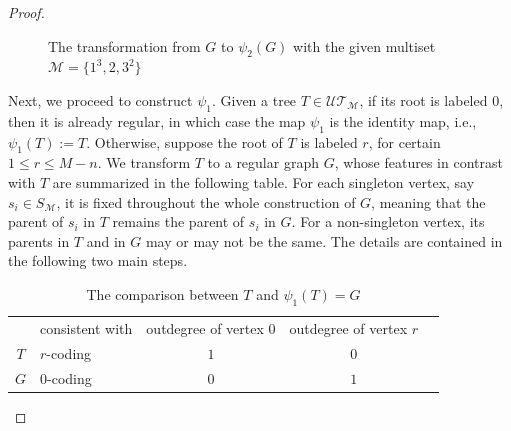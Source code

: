 \documentclass[11pt,reqno]{amsart}
\numberwithin{equation}{section}
\theoremstyle{plain}
\theoremstyle{definition}
\newcommand{\M}{\mathcal{M}}
\newcommand{\UT}{\mathcal{UT}}
\begin{document}
\begin{proof}
\begin{figure}[htb]
\caption{The transformation from $G$ to $\psi_2(G)$ with the given multiset $\M=\{1^3,2,3^2\}$}
\label{fig:psi2}
\end{figure}

Next, we proceed to construct $\psi_1$. Given a tree $T\in\UT_{\M}$, if its root is labeled $0$, then it is already regular, in which case the map $\psi_1$ is the identity map, i.e., $\psi_1(T):=T$. Otherwise, suppose the root of $T$ is labeled $r$, for certain $1\le r\le M-n$. We transform $T$ to a regular graph $G$, whose features in contrast with $T$ are summarized in the following table. For each singleton vertex, say $s_i\in S_{\M}$, it is fixed throughout the whole construction of $G$, meaning that the parent of $s_i$ in $T$ remains the parent of $s_i$ in $G$. For a non-singleton vertex, its parents in $T$ and in $G$ may or may not be the same. The details are contained in the following two main steps. 

\begin{table}[htb]
\centering
\begin{tabular}{cVc|c|c}
 & consistent with & outdegree of vertex $0$ & outdegree of vertex $r$\\
\Xhline{2pt}
$T$ & $r$-coding & $1$ & $0$\\
$G$ & $0$-coding & $0$ & $1$
\end{tabular}
\vspace{3mm}
\caption{The comparison between $T$ and $\psi_1(T)=G$}
\label{T and G}
\end{table}


\end{proof}
\end{document}
